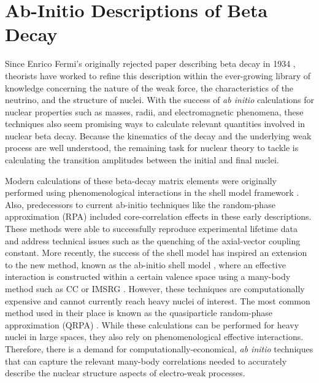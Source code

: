 \documentclass[../thesis.tex]{subfiles}
\begin{document}
\section{Ab-Initio Descriptions of Beta Decay}

Since Enrico Fermi's originally rejected paper describing beta decay in 1934 \cite{FERMI1934,WILSON1968}, theorists have worked to refine this description within the ever-growing library of knowledge concerning the nature of the weak force, the characteristics of the neutrino, and the structure of nuclei.  With the success of \emph{ab initio} calculations for nuclear properties such as masses, radii, and electromagnetic phenomena, these techniques also seem promising ways to calculate relevant quantities involved in nuclear beta decay.  Because the kinematics of the decay and the underlying weak process are well understood, the remaining task for nuclear theory to tackle is calculating the transition amplitudes between the initial and final nuclei.

Modern calculations of these beta-decay matrix elements were originally performed using phenomenological interactions in the shell model framework \cite{WILDENTHAL1983,BROWN1983,WARBURTON1992,ORMAND1995}.  Also, predecessors to current ab-initio techniques like the random-phase approximation (RPA) \cite{TOWNER1979} included core-correlation effects in these early descriptions.  These methods were able to successfully reproduce experimental lifetime data and address technical issues such as the quenching of the axial-vector coupling constant.  More recently, the success of the shell model has inspired an extension to the new method, known as the ab-initio shell model \cite{BARRETT2013131}, where an effective interaction is constructed within a certain valence space using a many-body method such as CC \cite{JANSEN2014} or IMSRG \cite{BOGNER2014}.  However, these techniques are computationally expensive and cannot currently reach heavy nuclei of interest.  The most common method used in their place is known as the quasiparticle random-phase approximation (QRPA) \cite{SUHONEN2013153,ENGEL2015}.  While these calculations can be performed for heavy nuclei in large spaces, they also rely on phenomenological effective interactions.  Therefore, there is a demand for computationally-economical, \emph{ab initio} techniques that can capture the relevant many-body correlations needed to accurately describe the nuclear structure aspects of electro-weak processes.
\end{document}
